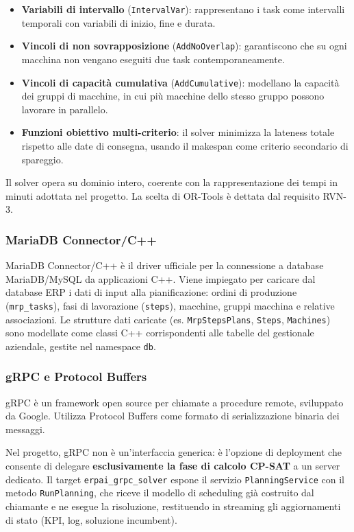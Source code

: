 \begin{itemize}
    \item \textbf{Variabili di intervallo} (\texttt{IntervalVar}): rappresentano i task come intervalli temporali con variabili di inizio, fine e durata.
    \item \textbf{Vincoli di non sovrapposizione} (\texttt{AddNoOverlap}): garantiscono che su ogni macchina non vengano eseguiti due task contemporaneamente.
    \item \textbf{Vincoli di capacità cumulativa} (\texttt{AddCumulative}): modellano la capacità dei gruppi di macchine, in cui più macchine dello stesso gruppo possono lavorare in parallelo.
    \item \textbf{Funzioni obiettivo multi-criterio}: il solver minimizza la lateness totale rispetto alle date di consegna, usando il makespan come criterio secondario di spareggio.
\end{itemize}

Il solver opera su dominio intero, coerente con la rappresentazione dei tempi in minuti adottata nel progetto. La scelta di OR-Tools è dettata dal requisito RVN-3.

\subsubsection{MariaDB Connector/C++}

MariaDB Connector/C++ è il driver ufficiale per la connessione a database MariaDB/MySQL da applicazioni C++. Viene impiegato per caricare dal database ERP i dati di input alla pianificazione: ordini di produzione (\texttt{mrp\_tasks}), fasi di lavorazione (\texttt{steps}), macchine, gruppi macchina e relative associazioni. Le strutture dati caricate (es. \texttt{MrpStepsPlans}, \texttt{Steps}, \texttt{Machines}) sono modellate come classi C++ corrispondenti alle tabelle del gestionale aziendale, gestite nel namespace \texttt{db}.

\subsubsection{gRPC e Protocol Buffers}

gRPC è un framework open source per chiamate a procedure remote, sviluppato da Google. Utilizza Protocol Buffers come formato di serializzazione binaria dei messaggi.

Nel progetto, gRPC non è un'interfaccia generica: è l'opzione di deployment che consente di delegare \textbf{esclusivamente la fase di calcolo CP-SAT} a un server dedicato. Il target \texttt{erpai\_grpc\_solver} espone il servizio \texttt{PlanningService} con il metodo \texttt{RunPlanning}, che riceve il modello di scheduling già costruito dal chiamante e ne esegue la risoluzione, restituendo in streaming gli aggiornamenti di stato (KPI, log, soluzione incumbent).

